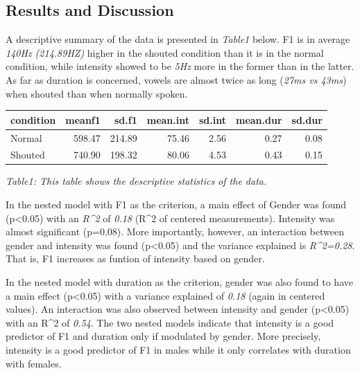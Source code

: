 \documentclass[floatsintext,man]{apa6}
\theoremstyle{definition}
\theoremstyle{definition}
\theoremstyle{definition}
\theoremstyle{remark}
\begin{document}
\subsection{Results and Discussion}\label{results-and-discussion}

A descriptive summary of the data is presented in \emph{Table1} below.
F1 is in average \emph{140Hz (214.89HZ)} higher in the shouted condition
than it is in the normal condition, while intensity showed to be
\emph{5Hz} more in the former than in the latter. As far as duration is
concerned, vowels are almost twice as long (\emph{27ms vs 43ms}) when
shouted than when normally spoken.

\begin{tabular}{l|r|r|r|r|r|r}
\hline
condition & meanf1 & sd.f1 & mean.int & sd.int & mean.dur & sd.dur\\
\hline
Normal & 598.47 & 214.89 & 75.46 & 2.56 & 0.27 & 0.08\\
\hline
Shouted & 740.90 & 198.32 & 80.06 & 4.53 & 0.43 & 0.15\\
\hline
\end{tabular}

\emph{Table1: This table shows the descriptive statistics of the data.}

In the nested model with F1 as the criterion, a main effect of Gender
was found (p\textless{}0.05) with an \emph{R\^{}2} of \emph{0.18}
(R\^{}2 of centered measurements). Intensity was almost significant
(p=0.08). More importantly, however, an interaction between gender and
intensity was found (p\textless{}0.05) and the variance explained is
\emph{R\^{}2=0.28}. That is, F1 increases as funtion of intensity based
on gender.

In the nested model with duration as the criterion, gender was also
found to have a main effect (p\textless{}0.05) with a variance explained
of \emph{0.18} (again in centered values). An interaction was also
observed between intensity and gender (p\textless{}0.05) with an R\^{}2
of \emph{0.54}. The two nested models indicate that intensity is a good
predictor of F1 and duration only if modulated by gender. More
precisely, intensity is a good predictor of F1 in males while it only
correlates with duration with females.
\end{document}
